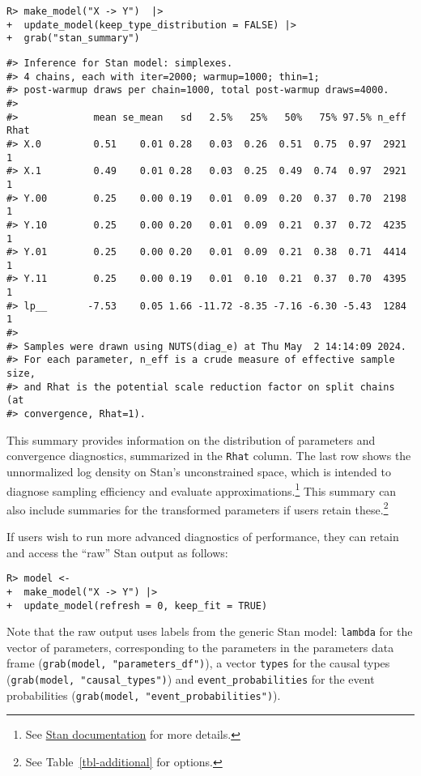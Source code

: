 \documentclass[
  11pt,
  article]{jss}
\begin{document}
\begin{verbatim}
R> make_model("X -> Y")  |> 
+  update_model(keep_type_distribution = FALSE) |>
+  grab("stan_summary") 
\end{verbatim}

\begin{verbatim}
#> Inference for Stan model: simplexes.
#> 4 chains, each with iter=2000; warmup=1000; thin=1; 
#> post-warmup draws per chain=1000, total post-warmup draws=4000.
#> 
#>             mean se_mean   sd   2.5%   25%   50%   75% 97.5% n_eff Rhat
#> X.0         0.51    0.01 0.28   0.03  0.26  0.51  0.75  0.97  2921    1
#> X.1         0.49    0.01 0.28   0.03  0.25  0.49  0.74  0.97  2921    1
#> Y.00        0.25    0.00 0.19   0.01  0.09  0.20  0.37  0.70  2198    1
#> Y.10        0.25    0.00 0.20   0.01  0.09  0.21  0.37  0.72  4235    1
#> Y.01        0.25    0.00 0.20   0.01  0.09  0.21  0.38  0.71  4414    1
#> Y.11        0.25    0.00 0.19   0.01  0.10  0.21  0.37  0.70  4395    1
#> lp__       -7.53    0.05 1.66 -11.72 -8.35 -7.16 -6.30 -5.43  1284    1
#> 
#> Samples were drawn using NUTS(diag_e) at Thu May  2 14:14:09 2024.
#> For each parameter, n_eff is a crude measure of effective sample size,
#> and Rhat is the potential scale reduction factor on split chains (at 
#> convergence, Rhat=1).
\end{verbatim}

This summary provides information on the distribution of parameters and
convergence diagnostics, summarized in the \texttt{Rhat} column. The
last row shows the unnormalized log density on Stan's unconstrained
space, which is intended to diagnose sampling efficiency and evaluate
approximations.\footnote{See
  \href{https://mc-stan.org/cmdstanr/reference/fit-method-lp.html}{Stan
  documentation} for more details.} This summary can also include
summaries for the transformed parameters if users retain
these.\footnote{See Table~\ref{tbl-additional} for options.}

If users wish to run more advanced diagnostics of performance, they can
retain and access the ``raw'' Stan output as follows:

\begin{verbatim}
R> model <- 
+  make_model("X -> Y") |> 
+  update_model(refresh = 0, keep_fit = TRUE)
\end{verbatim}

Note that the raw output uses labels from the generic Stan model:
\texttt{lambda} for the vector of parameters, corresponding to the
parameters in the parameters data frame
(\texttt{grab(model,\ "parameters\_df")}), a vector \texttt{types} for
the causal types (\texttt{grab(model,\ "causal\_types")}) and
\texttt{event\_probabilities} for the event probabilities
(\texttt{grab(model,\ "event\_probabilities")}).
\end{document}
